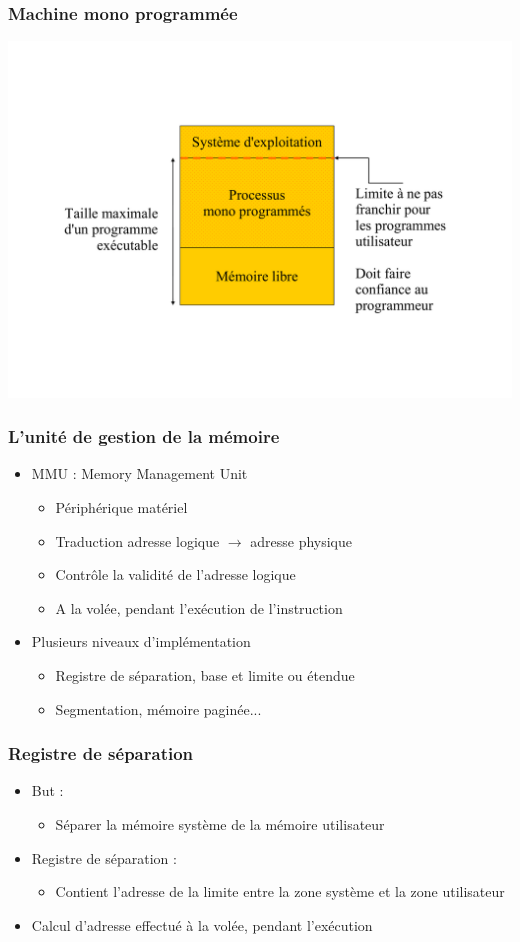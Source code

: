 \begin{frame}
\frametitle{Machine mono programmée}
\includegraphics[width=.9\textwidth]{../illustration/memoire_principale_monoprogramme.pdf}
\end{frame}


\begin{frame}
\frametitle{L'unité de gestion de la mémoire}
\begin{itemize}
\item MMU : Memory Management Unit
\begin{itemize}
\item Périphérique matériel
\item Traduction adresse logique $\rightarrow$ adresse physique
\item Contrôle la validité de l'adresse logique
\item A la volée, pendant l'exécution de l'instruction
\end{itemize}
\item Plusieurs niveaux d'implémentation
\begin{itemize}
\item Registre de séparation, base et limite ou étendue
\item Segmentation, mémoire paginée...
\end{itemize}
\end{itemize}
\end{frame}



\begin{frame}
\frametitle{Registre de séparation}
\begin{itemize}
\item But :
\begin{itemize}
\item Séparer la mémoire système de la mémoire utilisateur
\end{itemize}
\item Registre de séparation :
\begin{itemize}
\item Contient l'adresse de la limite entre la zone système et la zone utilisateur
\end{itemize}
\item Calcul d'adresse effectué à la volée, pendant l'exécution 
\end{itemize}
\end{frame}

